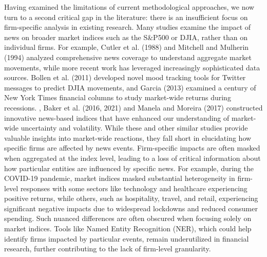 \mx
Having examined the limitations of current methodological approaches, we now turn to a second critical gap in the literature: there is an insufficient focus on firm-specific analysis in existing research. Many studies examine the impact of news on broader market indices
 such as the S\&P500 or DJIA, rather than on individual firms. 
For example, 
\cite{cutler1988moves}  Cutler et al. (1988) 
and 
\cite{mitchell1994impact}  Mitchell and Mulherin (1994) 
analyzed comprehensive news coverage to understand aggregate market movements, while more recent work has leveraged increasingly sophisticated data sources. 
\cite{bollen2011twitter} Bollen et al. (2011) 
developed novel mood tracking tools for Twitter messages to predict DJIA movements, and 
\cite{garcia2013sentiment} Garcia (2013) 
examined a century of New York Times financial columns to study market-wide returns during recessions. 
\cite{baker2016measuring}, \cite{baker2021triggers} Baker et al. (2016, 2021) 
and 
\cite{manela2017news} Manela and Moreira (2017) 
constructed innovative news-based indices that have enhanced our understanding of market-wide uncertainty and volatility.
While these and other similar studies provide valuable insights into market-wide reactions, they fall short in elucidating how specific firms are affected by news events. Firm-specific impacts are often masked when aggregated at the index level, leading to a loss of critical information about how particular entities are influenced by specific news. 
For example, during the COVID-19 pandemic, market indices masked substantial heterogeneity in firm-level responses
 with some sectors like technology and healthcare experiencing positive returns, while others, such as hospitality, travel, and retail, experiencing significant negative impacts due to widespread lockdowns and reduced consumer spending. 
Such nuanced differences are often obscured when focusing solely on market indices. Tools like Named Entity Recognition (NER), which could help identify firms impacted by particular events, remain underutilized in financial research, further contributing to the lack of firm-level granularity.


